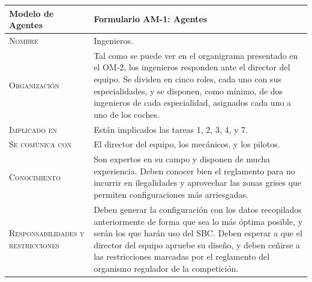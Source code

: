 \documentclass[12pt,a4paper,twoside,spanish]{article}      %
\begin{document}
\begin{table}[H]
\scriptsize
\begin{tabularx}{\textwidth}{|l|X|} \hline
\textbf{Modelo de Agentes} & \textbf{Formulario AM-1: Agentes} \\ \hline\hline
\textsc{Nombre} &  
Ingenieros.
\\ \hline

\textsc{Organización} &  
Tal como se puede ver en el organigrama presentado en el OM-2, los ingenieros responden ante el director del equipo. Se dividen en cinco roles, cada uno con sus especialidades, y se disponen, como mínimo, de dos ingenieros de cada especialidad, asignados cada uno a uno de los coches.
\\ \hline

\textsc{Implicado en} & 
Están implicados las tareas 1, 2, 3, 4, y 7.
\\ \hline

\textsc{Se comunica con} & 
El director del equipo, los mecánicos, y los pilotos.
\\ \hline

\textsc{Conocimiento} &  
Son expertos en su campo y disponen de mucha experiencia. Deben conocer bien el reglamento para no incurrir en ilegalidades y aprovechar las zonas grises que permiten configuraciones más arriesgadas.
\\ \hline

\textsc{Responsabilidades y restricciones} & 
Deben generar la configuración con los datos recopilados anteriormente de forma que sea lo más óptima posible, y serán los que harán uso del SBC. Deben esperar a que el director del equipo apruebe su diseño, y deben ceñirse a las restricciones marcadas por el reglamento del organismo regulador de la competición.
\\ \hline
\end{tabularx}
 \label{tab.AM1}
\end{table}

\end{document}
